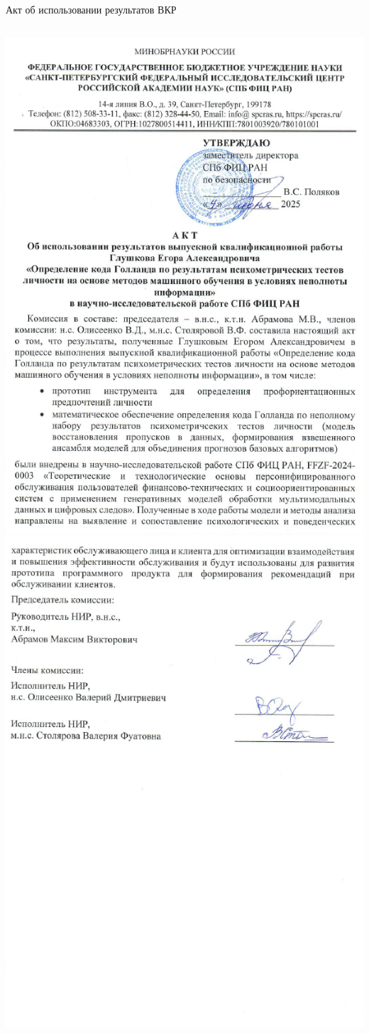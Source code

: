 \documentclass
  [ russian
  , aspectratio=169 %
  ] {beamer}
\begin{document}
\begin{frame}{Акт об использовании результатов ВКР}
  \begin{columns}[T,onlytextwidth]
      \centering
      \includegraphics[width=0.72\linewidth]{figures/Акт-1.PNG}
      \centering
      \includegraphics[width=0.75\linewidth]{figures/Акт-2.PNG}
  \end{columns}
\end{frame}
\end{document}
